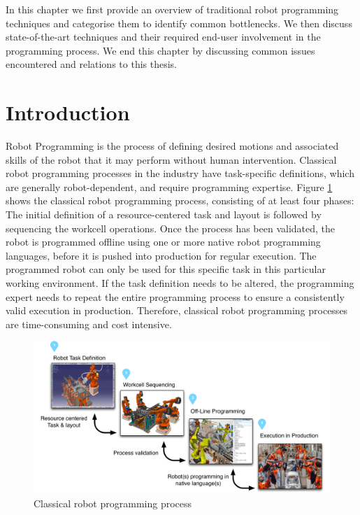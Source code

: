 In this chapter we first provide an overview of traditional robot programming techniques and categorise them to identify common bottlenecks.
We then discuss state-of-the-art techniques and their required end-user involvement in the programming process.
We end this chapter by discussing common issues encountered and relations to this thesis.

\section{Introduction}
Robot Programming is the process of defining desired motions and associated skills of the robot that it may perform without human intervention.
Classical robot programming processes in the industry have task-specific definitions, which are generally robot-dependent, and require programming expertise.
Figure \ref{fig:Classical robot programming process} shows the classical robot programming process, consisting of at least four phases:
The initial definition of a resource-centered task and layout is followed by sequencing the workcell operations.
Once the process has been validated, the robot is programmed offline using one or more native robot programming languages, before it is pushed into production for regular execution.
The programmed robot can only be used for this specific task in this particular working environment.
If the task definition needs to be altered, the programming expert needs to repeat the entire programming process to ensure a consistently valid execution in production.
Therefore, classical robot programming processes are time-consuming and cost intensive.

\begin{figure}[ht]
	\centering
	\includegraphics[width=\linewidth]{figures/manual-programming}
	\caption{Classical robot programming process}
	\label{fig:Classical robot programming process}
\end{figure}

